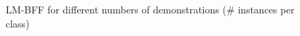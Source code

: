 \documentclass[a4paper,12pt]{article}   %
\begin{document}
\begin{figure}[htb]
  \vspace{0.1\baselineskip}  
  \centering  
    \caption{LM-BFF for different numbers of demonstrations (\# instances per class)}
    \label{fig:demo}
  \vspace{0.1\baselineskip}
\end{figure}	
\end{document}
